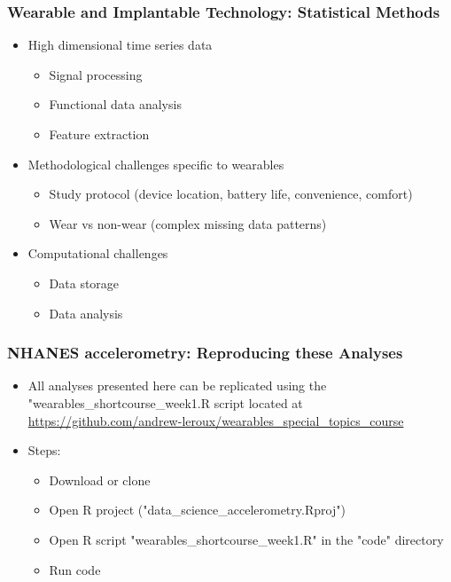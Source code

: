 \documentclass[10pt]{beamer}\usepackage[]{graphicx}\usepackage[]{color}
\begin{document}
\begin{frame}
\frametitle{Wearable and Implantable Technology: Statistical Methods}
\begin{itemize}
\item High dimensional time series data
    \begin{itemize}
    \item Signal processing
    \item Functional data analysis
    \item Feature extraction
    \end{itemize}
\item Methodological challenges specific to wearables
    \begin{itemize}
    \item Study protocol (device location, battery life, convenience, comfort)
    \item Wear vs non-wear (complex missing data patterns)
    \end{itemize}
\item Computational challenges
    \begin{itemize}
    \item Data storage
    \item Data analysis
    \end{itemize}
\end{itemize}
\end{frame}



\begin{frame}
\frametitle{NHANES accelerometry: Reproducing these Analyses}
\begin{itemize}
\item All analyses presented here can be replicated using the "wearables\_shortcourse\_week1.R script located at 
\url{https://github.com/andrew-leroux/wearables_special_topics_course}
\item Steps:
    \begin{itemize}
    \item Download or clone
    \item Open R project ("data\_science\_accelerometry.Rproj")
    \item Open R script "wearables\_shortcourse\_week1.R" in the "code" directory
    \item Run code
    \end{itemize}
\end{itemize}
\end{frame}
\end{document}
